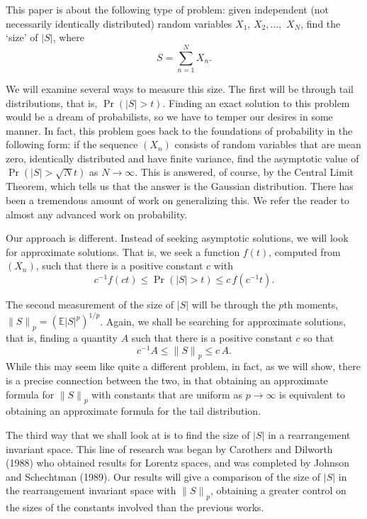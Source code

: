 \documentclass[12pt]{article}
\newcommand{\E}{{\mathbb E}}
\newcommand{\modo}[1]{{\left|#1\right|}}
\newcommand{\smodo}[1]{{\mathopen|#1\mathclose|}}
\newcommand{\snormo}[1]{{\mathopen\|#1\mathclose\|}}
\begin{document}
This paper is about the following type of problem: 
given independent (not necessarily identically distributed) random
variables 
$X_1$, $X_2,\dots,$ $ X_N$, find the `size' of $\smodo S$, 
where 
$$ S =\sum_{n=1}^N X_n .$$ 

We will examine several ways to measure this size.  The first will be through
tail distributions, that is, $\Pr(\smodo S > t)$.
Finding an exact
solution to this problem would be a dream of probabilists,  so we
have to 
temper our desires in some manner. In fact, this problem goes back to
the 
foundations of probability in the following form: if the sequence
$(X_n)$ 
consists of random variables that are mean zero, identically
distributed and have finite variance, find the asymptotic value of 
$\Pr(\smodo S > \sqrt N t)$ as $N \to \infty$. This is answered, of
course, 
by the Central Limit Theorem, which tells us that the answer is the
Gaussian 
distribution. There has been a tremendous amount of work on
generalizing 
this. We refer the reader to almost any advanced work on probability. 

Our approach is different. Instead of seeking asymptotic solutions,
we will look for approximate solutions. That is, we seek a function
$f(t)$, 
computed  from $(X_n)$, such that there is a positive constant $c$ with 
$$ c^{-1} f(c t) \le \Pr(|S|>t) \le c \, f(c^{-1} t) .$$ 

The second 
measurement of the size of $\smodo S$ will be through
the $p$th moments, $\snormo S_p = (\E\modo S^p)^{1/p}$.  
Again, we shall be searching for approximate solutions, that is, finding
a quantity $A$ such that there is a positive constant $c$ so that
$$ c^{-1} A \le \snormo S_p \le c \, A .$$
While this may seem like quite a
different problem, in fact, as we will show, there is a precise connection
between the two, in that obtaining an approximate formula for $\snormo S_p$
with constants that are uniform as $p\to \infty$ is equivalent to obtaining
an approximate formula for the tail distribution.

The third way that we shall look at is to find the size of $\smodo S$ in
a rearrangement invariant space.  This line of research was began by
Carothers and Dilworth (1988) who obtained results for Lorentz spaces,
and was completed by Johnson and Schechtman (1989).  Our results will
give a comparison of the size of $\smodo S$ in the rearrangement invariant
space with $\snormo S_p$, obtaining a greater control on the sizes of the
constants involved than the previous works.
\end{document}
